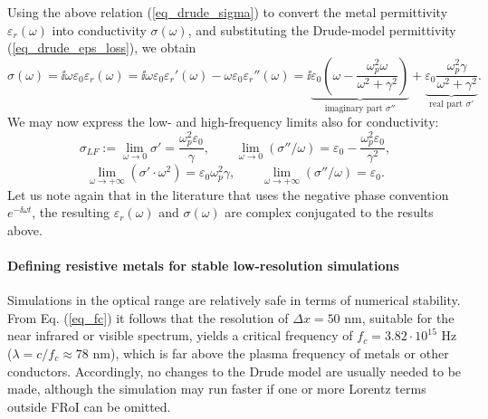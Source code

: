 Using the above relation (\ref{eq_drude_sigma}) to convert the metal permittivity $\varepsilon_r(\omega)$ into conductivity $\sigma(\omega)$, and substituting the Drude-model permittivity (\ref{eq_drude_eps_loss}), we obtain
\begin{equation} \sigma(\omega) = \ii \omega \varepsilon_0 \varepsilon_r(\omega)= \ii\omega \varepsilon_0 \varepsilon_r'(\omega)  -  \omega \varepsilon_0 \varepsilon_r''(\omega) = 
	\ii \underbrace{\varepsilon_0 \left(\omega - \frac{\omega_p^2\omega}{\omega^2+\gamma^2}\right)}_{\text{imaginary part } \sigma''}  + 
		\underbrace{\varepsilon_0\frac{\omega_p^2\gamma}{\omega^2+\gamma^2}}_{\text{real part } \sigma'}. \label{eq_drude_sigmaeps1}\end{equation}
We may now express the low- and high-frequency limits also for conductivity:
\begin{equation} \sigma_{LF} := \lim_{\omega \to 0} \sigma' = \frac{\omega_p^2\varepsilon_0}{\gamma}, \quad \quad  
				 \lim_{\omega \to 0} (\sigma'' / \omega) = \varepsilon_0 - \frac{\omega_p^2 \varepsilon_0}{\gamma^2} , \label{eq_drude_sigmalimlow}\end{equation}
\begin{equation} \lim_{\omega \to +\infty} (\sigma' \cdot \omega^2) = \varepsilon_0\omega_p^2\gamma, \quad \quad  
				 \lim_{\omega \to +\infty} (\sigma'' / \omega) = \varepsilon_0. \label{eq_drude_sigma_limup}\end{equation}
Let us note again that in the literature that uses the negative phase convention $e^{-\ii \omega t}$, the resulting $\varepsilon_r(\omega)$ and $\sigma(\omega)$ are complex conjugated to the results above. 
\paragraph{Defining resistive metals for stable low-resolution simulations} %
Simulations in the optical range are relatively safe in terms of numerical stability. From Eq. (\ref{eq_fc}) it follows that the resolution of $\Delta x = 50$ nm, suitable for the near infrared or visible spectrum, yields a critical frequency of $f_c = 3.82\cdot 10^{15}$ Hz ($\lambda = c/f_c \approx 78$ nm), which is far above the plasma frequency of metals or other conductors. Accordingly, no changes to the Drude model are usually needed to be made, although the simulation may run faster if one or more Lorentz terms outside FRoI can be omitted.
 

